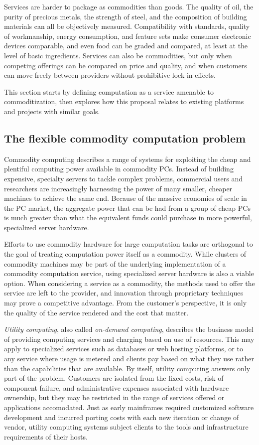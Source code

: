 Services are harder to package as commodities than goods. The quality of oil, the purity of precious metals, the strength of steel, and the composition of building materials can all be objectively measured. Compatibility with standards, quality of workmanship, energy consumption, and feature sets make consumer electronic devices comparable, and even food can be graded and compared, at least at the level of basic ingredients. Services can also be commodities, but only when competing offerings can be compared on price and quality, and when customers can move freely between providers without prohibitive lock-in effects.

This section starts by defining computation as a service amenable to commoditization, then explores how this proposal relates to existing platforms and projects with similar goals.

\subsection{The flexible commodity computation problem}

Commodity computing describes a range of systems for exploiting the cheap and plentiful computing power available in commodity PCs. Instead of building expensive, specialty servers to tackle complex problems, commercial users and researchers are increasingly harnessing the power of many smaller, cheaper machines to achieve the same end. Because of the massive economies of scale in the PC market, the aggregate power that can be had from a group of cheap PCs is much greater than what the equivalent funds could purchase in more powerful, specialized server hardware.

Efforts to use commodity hardware for large computation tasks are orthogonal to the goal of treating computation power itself as a commodity. While clusters of commodity machines may be part of the underlying implementation of a commodity computation service, using specialized server hardware is also a viable option. When considering a service as a commodity, the methods used to offer the service are left to the provider, and innovation through proprietary techniques may prove a competitive advantage. From the customer's perspective, it is only the quality of the service rendered and the cost that matter.

\emph{Utility computing}, also called \emph{on-demand computing}, describes the business model of providing computing services and charging based on use of resources. This may apply to specialized services such as databases or web hosting platforms, or to any service where usage is metered and clients pay based on what they use rather than the capabilities that are available. By itself, utility computing answers only part of the problem. Customers are isolated from the fixed costs, risk of component failure, and administrative expenses associated with hardware ownership, but they may be restricted in the range of services offered or applications accomodated. Just as early mainframes required customized software development and incurred porting costs with each new iteration or change of vendor, utility computing systems subject clients to the tools and infrastructure requirements of their hosts.

